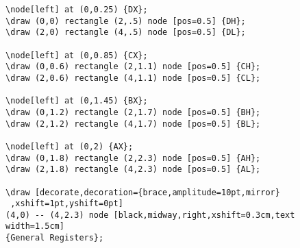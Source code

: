 \begin{note}
\begin{center}
\begin{lstlisting}[language={[LaTeX]TeX},basicstyle=\ttfamily]
\node[left] at (0,0.25) {DX};
\draw (0,0) rectangle (2,.5) node [pos=0.5] {DH};
\draw (2,0) rectangle (4,.5) node [pos=0.5] {DL};

\node[left] at (0,0.85) {CX};
\draw (0,0.6) rectangle (2,1.1) node [pos=0.5] {CH};
\draw (2,0.6) rectangle (4,1.1) node [pos=0.5] {CL};

\node[left] at (0,1.45) {BX};
\draw (0,1.2) rectangle (2,1.7) node [pos=0.5] {BH};
\draw (2,1.2) rectangle (4,1.7) node [pos=0.5] {BL};

\node[left] at (0,2) {AX};
\draw (0,1.8) rectangle (2,2.3) node [pos=0.5] {AH};
\draw (2,1.8) rectangle (4,2.3) node [pos=0.5] {AL};

\draw [decorate,decoration={brace,amplitude=10pt,mirror}
 ,xshift=1pt,yshift=0pt]
(4,0) -- (4,2.3) node [black,midway,right,xshift=0.3cm,text width=1.5cm] 
{General Registers};
\end{lstlisting}
\end{center}
\end{note}

